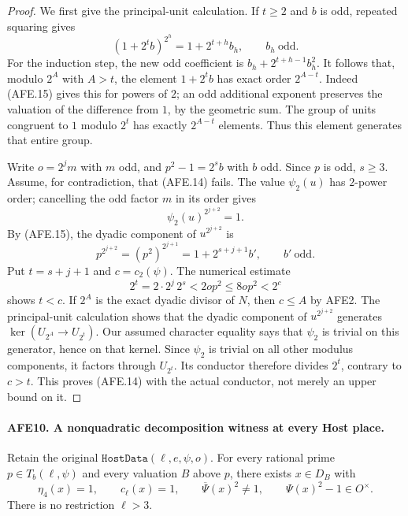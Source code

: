 \begin{proof}
We first give the principal-unit calculation.
If \(t\ge2\) and \(b\) is odd, repeated squaring gives
\[
             (1+2^t b)^{2^h}
                    =1+2^{t+h}b_h,\qquad b_h\ \text{odd}.
                                                        \tag{AFE.15}
\]
For the induction step, the new odd coefficient is
\(b_h+2^{t+h-1}b_h^2\).
It follows that, modulo \(2^A\) with \(A>t\),
the element \(1+2^t b\) has exact order \(2^{A-t}\).
Indeed (AFE.15) gives this for powers of \(2\);
an odd additional exponent preserves the valuation
of the difference from \(1\), by the geometric sum.
The group of units congruent to \(1\) modulo \(2^t\)
has exactly \(2^{A-t}\) elements.  Thus this element
generates that entire group.

Write \(o=2^j m\) with \(m\) odd, and
\(p^2-1=2^s b\) with \(b\) odd.
Since \(p\) is odd, \(s\ge3\).
Assume, for contradiction, that (AFE.14) fails.
The value \(\psi_2(u)\) has \(2\)-power order;
cancelling the odd factor \(m\) in its order gives
\[
                         \psi_2(u)^{2^{j+2}}=1.
 \]
By (AFE.15), the dyadic component of
\(u^{2^{j+2}}\) is
\[
         p^{2^{j+2}}=(p^2)^{2^{j+1}}
                    =1+2^{s+j+1}b',\qquad b'\ \text{odd}.
 \]
Put \(t=s+j+1\) and \(c=c_2(\psi)\).
The numerical estimate
\[
        2^t=2\cdot2^j\,2^s
                    <2op^2\le8op^2<2^c
 \]
shows \(t<c\).
If \(2^A\) is the exact dyadic divisor of \(N\),
then \(c\le A\) by AFE2.
The principal-unit calculation shows that the dyadic
component of \(u^{2^{j+2}}\) generates
\(\ker(U_{2^A}\to U_{2^t})\).
Our assumed character equality says that \(\psi_2\)
is trivial on this generator, hence on that kernel.
Since \(\psi_2\) is trivial on all other modulus
components, it factors through \(U_{2^t}\).
Its conductor therefore divides \(2^t\), contrary
to \(c>t\).
This proves (AFE.14) with the actual conductor,
not merely an upper bound on it.
\end{proof}

\paragraph{AFE10. A nonquadratic decomposition witness at every Host place.}
\label{claim:AFE10}
Retain the original
\(\texttt{HostData}(\ell,e,\psi,o)\).
For every rational prime \(p\in T_b(\ell,\psi)\)
and every valuation \(B\) above \(p\), there exists
\(x\in D_B\) with
\[
 \eta_4(x)=1,\qquad c_\ell(x)=1,\qquad
 \overline\Psi(x)^2\ne1,\qquad
                         \Psi(x)^2-1\in O^\times.
                                                        \tag{AFE.16}
\]
There is no restriction \(\ell>3\).


